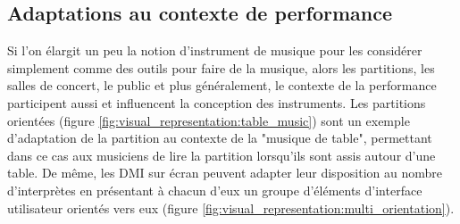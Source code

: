 \subsection{Adaptations au contexte de performance}
Si l'on élargit un peu la notion d'instrument de musique pour les considérer simplement comme des outils pour faire de la musique, alors les partitions, les salles de concert, le public et plus généralement, le contexte de la performance participent aussi et influencent la conception des instruments. Les partitions orientées (figure \ref{fig:visual_representation:table_music}) sont un exemple d'adaptation de la partition au contexte de la "musique de table", permettant dans ce cas aux musiciens de lire la partition lorsqu'ils sont assis autour d'une table. De même, les DMI sur écran peuvent adapter leur disposition au nombre d'interprètes en présentant à chacun d'eux un groupe d'éléments d'interface utilisateur orientés vers eux (figure \ref{fig:visual_representation:multi_orientation}).

